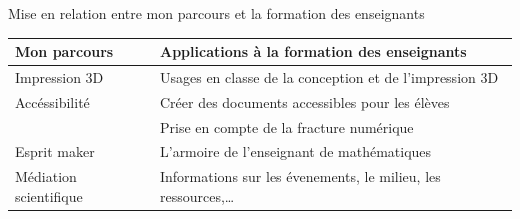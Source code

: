 \documentclass[
  french,
  ignorenonframetext,
]{beamer}
\begin{document}
\begin{frame}{Mise en relation entre mon parcours et la formation des
enseignants}
\protect\hypertarget{mise-en-relation-entre-mon-parcours-et-la-formation-des-enseignants}{}
\begin{longtable}[]{@{}ll@{}}
\toprule
\begin{minipage}[b]{0.18\columnwidth}\raggedright
Mon parcours\strut
\end{minipage} & \begin{minipage}[b]{0.76\columnwidth}\raggedright
Applications à la formation des enseignants\strut
\end{minipage}\tabularnewline
\midrule
\endhead
\begin{minipage}[t]{0.18\columnwidth}\raggedright
Impression 3D\strut
\end{minipage} & \begin{minipage}[t]{0.76\columnwidth}\raggedright
Usages en classe de la conception et de l'impression 3D\strut
\end{minipage}\tabularnewline
\begin{minipage}[t]{0.18\columnwidth}\raggedright
Accéssibilité\strut
\end{minipage} & \begin{minipage}[t]{0.76\columnwidth}\raggedright
Créer des documents accessibles pour les élèves\strut
\end{minipage}\tabularnewline
\begin{minipage}[t]{0.18\columnwidth}\raggedright
\strut
\end{minipage} & \begin{minipage}[t]{0.76\columnwidth}\raggedright
Prise en compte de la fracture numérique\strut
\end{minipage}\tabularnewline
\begin{minipage}[t]{0.18\columnwidth}\raggedright
Esprit maker\strut
\end{minipage} & \begin{minipage}[t]{0.76\columnwidth}\raggedright
L'armoire de l'enseignant de mathématiques\strut
\end{minipage}\tabularnewline
\begin{minipage}[t]{0.18\columnwidth}\raggedright
Médiation scientifique\strut
\end{minipage} & \begin{minipage}[t]{0.76\columnwidth}\raggedright
Informations sur les évenements, le milieu, les
ressources,\ldots{}\strut
\end{minipage}\tabularnewline
\bottomrule
\end{longtable}
\end{frame}
\end{document}
